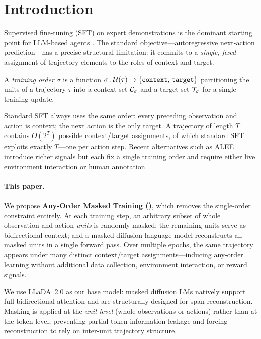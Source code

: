 \section{Introduction}
\label{sec:intro}

Supervised fine-tuning (SFT) on expert demonstrations is the dominant starting
point for LLM-based agents \citep{deng2023mind2web,zeng2023agenttuning,yao2023react}.
The standard objective---autoregressive next-action prediction---has a precise
structural limitation: it commits to a \emph{single, fixed} assignment of trajectory
elements to the roles of context and target.

\begin{definition}
\label{def:order}
A \emph{training order} $\sigma$ is a function
$\sigma\colon \mathcal{U}(\tau) \to \{\texttt{context},\, \texttt{target}\}$
partitioning the units of a trajectory $\tau$ into a context set $\mathcal{C}_\sigma$
and a target set $\mathcal{T}_\sigma$ for a single training update.
\end{definition}

Standard SFT always uses the same order: every preceding observation and action
is context; the next action is the only target. A trajectory of length $T$ contains
$O(2^T)$ possible context/target assignments, of which standard SFT exploits
exactly $T$---one per action step. Recent alternatives such as
ALEE \citep{zhang2025alee} introduce richer signals but each fix a single training
order and require either live environment interaction or human annotation.

\paragraph{This paper.}
We propose \textbf{Any-Order Masked Training (\aomt{})}, which removes the
single-order constraint entirely. At each training step, an arbitrary subset of
whole observation and action \emph{units} is randomly masked; the remaining units
serve as bidirectional context; and a masked diffusion language model
\citep{nie2025llada} reconstructs all masked units in a single forward pass.
Over multiple epochs, the same trajectory appears under many distinct
context/target assignments---inducing any-order learning without additional data
collection, environment interaction, or reward signals.

We use LLaDA~2.0 \citep{bie2025llada20} as our base model: masked diffusion LMs
natively support full bidirectional attention and are structurally designed for
span reconstruction. Masking is applied at the \emph{unit level} (whole
observations or actions) rather than at the token level, preventing partial-token
information leakage and forcing reconstruction to rely on inter-unit trajectory
structure.

